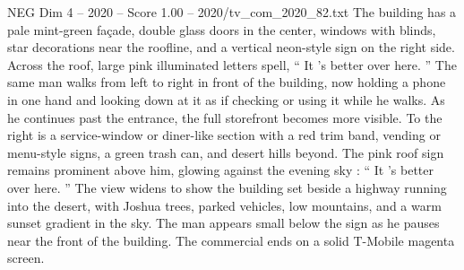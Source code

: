 \begin{textsample}{NEG Dim 4 – 2020 – Score 1.00 – 2020/tv\_com\_2020\_82.txt}
The building has a pale mint-green façade, double glass doors in the center, windows with blinds, star decorations near the roofline, and a vertical neon-style sign on the right side.
Across the roof, large pink illuminated letters spell, “ It ’s better over here. ” The same man walks from left to right in front of the building, now holding a phone in one hand and looking down at it as if checking or using it while he walks.
As he continues past the entrance, the full storefront becomes more visible.
To the right is a service-window or diner-like section with a red trim band, vending or menu-style signs, a green trash can, and desert hills beyond.
The pink roof sign remains prominent above him, glowing against the evening sky : “ It ’s better over here. ” The view widens to show the building set beside a highway running into the desert, with Joshua trees, parked vehicles, low mountains, and a warm sunset gradient in the sky.
The man appears small below the sign as he pauses near the front of the building.
The commercial ends on a solid T-Mobile magenta screen.

\end{textsample}
